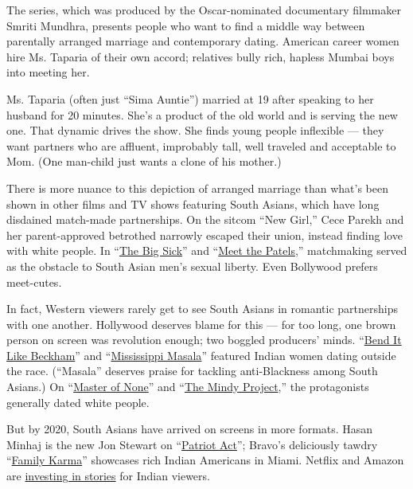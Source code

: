 The series, which was produced by the Oscar-nominated documentary
filmmaker Smriti Mundhra, presents people who want to find a middle way
between parentally arranged marriage and contemporary dating. American
career women hire Ms. Taparia of their own accord; relatives bully rich,
hapless Mumbai boys into meeting her.

Ms. Taparia (often just ``Sima Auntie'') married at 19 after speaking to
her husband for 20 minutes. She's a product of the old world and is
serving the new one. That dynamic drives the show. She finds young
people inflexible --- they want partners who are affluent, improbably
tall, well traveled and acceptable to Mom. (One man-child just wants a
clone of his mother.)

There is more nuance to this depiction of arranged marriage than what's
been shown in other films and TV shows featuring South Asians, which
have long disdained match-made partnerships. On the sitcom ``New Girl,''
Cece Parekh and her parent-approved betrothed narrowly escaped their
union, instead finding love with white people. In
``\href{https://www.nytimes.com/2017/07/23/movies/the-big-sick-south-asian-identity-and-marriage.html}{The
Big Sick}'' and
``\href{https://www.nytimes.com/2015/09/11/movies/review-in-meet-the-patels-a-son-submits-to-a-marriage-quest.html}{Meet
the Patels},'' matchmaking served as the obstacle to South Asian men's
sexual liberty. Even Bollywood prefers meet-cutes.

In fact, Western viewers rarely get to see South Asians in romantic
partnerships with one another. Hollywood deserves blame for this --- for
too long, one brown person on screen was revolution enough; two boggled
producers' minds.
``\href{https://www.nytimes.com/2003/03/12/movies/film-review-her-mom-may-kick-but-a-girl-plays-to-win.html}{Bend
It Like Beckham}'' and
``\href{https://www.nytimes.com/1992/02/05/movies/review-film-indian-immigrants-in-a-black-and-white-milieu.html}{Mississippi
Masala}'' featured Indian women dating outside the race. (``Masala''
deserves praise for tackling anti-Blackness among South Asians.) On
``\href{https://www.nytimes.com/watching/recommendations/watching-tv-master-of-none}{Master
of None}'' and
``\href{https://www.nytimes.com/watching/recommendations/watching-tv-the-mindy-project}{The
Mindy Project},'' the protagonists generally dated white people.

But by 2020, South Asians have arrived on screens in more formats. Hasan
Minhaj is the new Jon Stewart on
``\href{https://www.nytimes.com/2018/10/18/arts/television/hasan-minhaj-netflix-patriot-act.html}{Patriot
Act}''; Bravo's deliciously tawdry
``\href{https://www.nytimes.com/2019/10/29/style/bravo-real-housewives-race.html}{Family
Karma}'' showcases rich Indian Americans in Miami. Netflix and Amazon
are
\href{https://www.nytimes.com/2019/12/30/arts/television/indian-tv-amazon-netflix.html}{investing
in stories} for Indian viewers.

